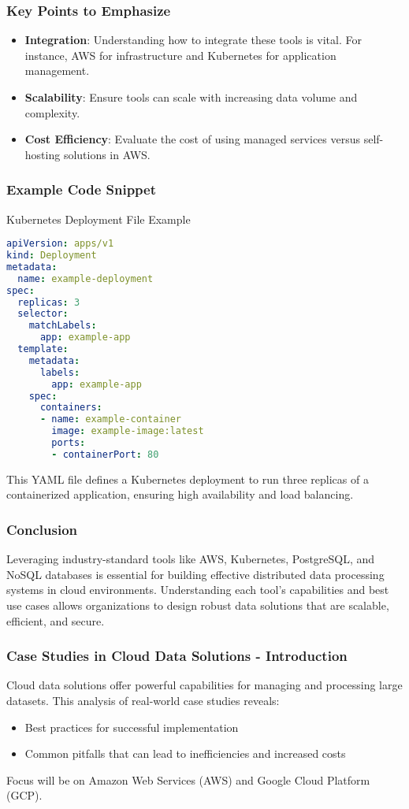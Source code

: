 \documentclass[aspectratio=169]{beamer}
\begin{document}
\begin{frame}[fragile]
    \frametitle{Key Points to Emphasize}
    \begin{itemize}
        \item \textbf{Integration}: Understanding how to integrate these tools is vital. For instance, AWS for infrastructure and Kubernetes for application management.
        \item \textbf{Scalability}: Ensure tools can scale with increasing data volume and complexity.
        \item \textbf{Cost Efficiency}: Evaluate the cost of using managed services versus self-hosting solutions in AWS.
    \end{itemize}
\end{frame}

\begin{frame}[fragile]
    \frametitle{Example Code Snippet}
    \begin{block}{Kubernetes Deployment File Example}
    \begin{lstlisting}[language=yaml]
apiVersion: apps/v1
kind: Deployment
metadata:
  name: example-deployment
spec:
  replicas: 3
  selector:
    matchLabels:
      app: example-app
  template:
    metadata:
      labels:
        app: example-app
    spec:
      containers:
      - name: example-container
        image: example-image:latest
        ports:
        - containerPort: 80
    \end{lstlisting}
    \end{block}
    This YAML file defines a Kubernetes deployment to run three replicas of a containerized application, ensuring high availability and load balancing.
\end{frame}

\begin{frame}
    \frametitle{Conclusion}
    Leveraging industry-standard tools like AWS, Kubernetes, PostgreSQL, and NoSQL databases is essential for building effective distributed data processing systems in cloud environments.
    Understanding each tool's capabilities and best use cases allows organizations to design robust data solutions that are scalable, efficient, and secure.
\end{frame}

\begin{frame}[fragile]
    \frametitle{Case Studies in Cloud Data Solutions - Introduction}
    Cloud data solutions offer powerful capabilities for managing and processing large datasets. This analysis of real-world case studies reveals:
    \begin{itemize}
        \item Best practices for successful implementation
        \item Common pitfalls that can lead to inefficiencies and increased costs
    \end{itemize}
    Focus will be on Amazon Web Services (AWS) and Google Cloud Platform (GCP).
\end{frame}
\end{document}
